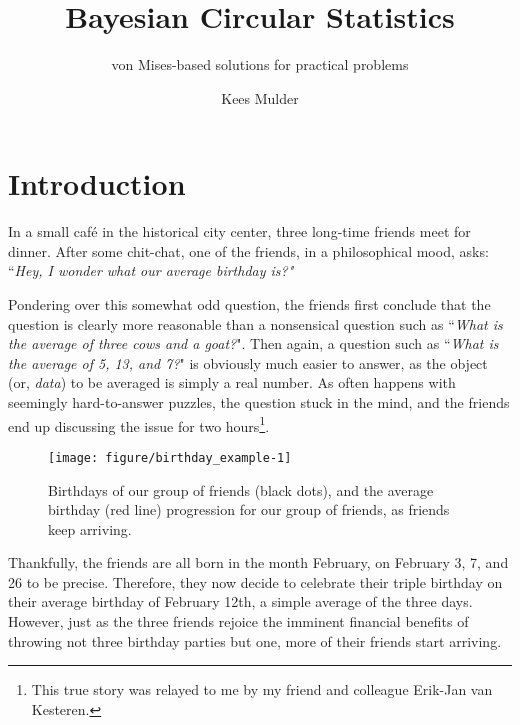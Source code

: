 \documentclass[12pt, a4paper]{book}\usepackage[]{graphicx}\usepackage{xcolor}
\title{Bayesian Circular Statistics}
\subtitle{von Mises-based solutions for practical problems}
\author{Kees Mulder}
\makeatletter
\def\maxwidth{ %
  \ifdim\Gin@nat@width>\linewidth
    \linewidth
  \else
    \Gin@nat@width
  \fi
}
\newenvironment{knitrout}{}{} %
\makeatother
\begin{document}
\frontmatter

\maketitle

\tableofcontents



\chapter{Introduction}
\label{intro}

In a small caf\'e in the historical city center, three long-time friends meet for dinner. After some chit-chat, one of the friends, in a philosophical mood, asks: ``\textit{Hey, I wonder what our average birthday is?"}

Pondering over this somewhat odd question, the friends first conclude that the question is clearly more reasonable than a nonsensical question such as ``\textit{What is the average of three cows and a goat?}". Then again, a question such as ``\textit{What is the average of 5, 13, and 7?}" is obviously much easier to answer, as the object (or, \textit{data}) to be averaged is simply a real number. As often happens with seemingly hard-to-answer puzzles, the question stuck in the mind, and the friends end up discussing the issue for two hours\footnote{This true story was relayed to me by my friend and colleague Erik-Jan van Kesteren.}.


\begin{figure}
\begin{knitrout}
\color{fgcolor}
\texttt{[image: figure/birthday\_example-1]} 

\end{knitrout}
\caption{Birthdays of our group of friends (black dots), and the average birthday (red line) progression for our group of friends, as friends keep arriving.}
\label{birthday_example}
\end{figure}


Thankfully, the friends are all born in the month February, on February 3, 7, and 26 to be precise. Therefore, they now decide to celebrate their triple birthday on their average birthday of February 12th, a simple average of the three days. However, just as the three friends rejoice the imminent financial benefits of throwing not three birthday parties but one, more of their friends start arriving.
\end{document}
